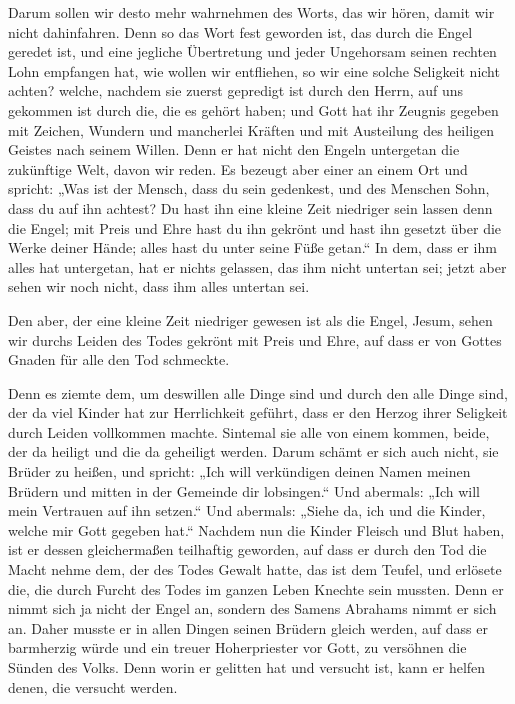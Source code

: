  Darum sollen wir desto mehr wahrnehmen des Worts, das wir
hören, damit wir nicht dahinfahren.  Denn so das Wort fest
geworden ist, das durch die Engel geredet ist, und eine jegliche
Übertretung und jeder Ungehorsam seinen rechten Lohn empfangen hat,
 wie wollen wir entfliehen, so wir eine solche Seligkeit
nicht achten? welche, nachdem sie zuerst gepredigt ist durch den Herrn,
auf uns gekommen ist durch die, die es gehört haben;  und
Gott hat ihr Zeugnis gegeben mit Zeichen, Wundern und mancherlei Kräften
und mit Austeilung des heiligen Geistes nach seinem Willen.
 Denn er hat nicht den Engeln untergetan die zukünftige
Welt, davon wir reden.  Es bezeugt aber einer an einem Ort
und spricht: „Was ist der Mensch, dass du sein gedenkest, und des
Menschen Sohn, dass du auf ihn achtest?  Du hast ihn eine
kleine Zeit niedriger sein lassen denn die Engel; mit Preis und Ehre
hast du ihn gekrönt und hast ihn gesetzt über die Werke deiner Hände;
 alles hast du unter seine Füße getan.`` In dem, dass er
ihm alles hat untergetan, hat er nichts gelassen, das ihm nicht untertan
sei; jetzt aber sehen wir noch nicht, dass ihm alles untertan sei.

 Den aber, der eine kleine Zeit niedriger gewesen ist als
die Engel, Jesum, sehen wir durchs Leiden des Todes gekrönt mit Preis
und Ehre, auf dass er von Gottes Gnaden für alle den Tod schmeckte.

 Denn es ziemte dem, um deswillen alle Dinge sind und
durch den alle Dinge sind, der da viel Kinder hat zur Herrlichkeit
geführt, dass er den Herzog ihrer Seligkeit durch Leiden vollkommen
machte.  Sintemal sie alle von einem kommen, beide, der
da heiligt und die da geheiligt werden. Darum schämt er sich auch nicht,
sie Brüder zu heißen,  und spricht: „Ich will verkündigen
deinen Namen meinen Brüdern und mitten in der Gemeinde dir lobsingen.``
 Und abermals: „Ich will mein Vertrauen auf ihn setzen.``
Und abermals: „Siehe da, ich und die Kinder, welche mir Gott gegeben
hat.``  Nachdem nun die Kinder Fleisch und Blut haben,
ist er dessen gleichermaßen teilhaftig geworden, auf dass er durch den
Tod die Macht nehme dem, der des Todes Gewalt hatte, das ist dem Teufel,
 und erlösete die, die durch Furcht des Todes im ganzen
Leben Knechte sein mussten.  Denn er nimmt sich ja nicht
der Engel an, sondern des Samens Abrahams nimmt er sich an.
 Daher musste er in allen Dingen seinen Brüdern gleich
werden, auf dass er barmherzig würde und ein treuer Hoherpriester vor
Gott, zu versöhnen die Sünden des Volks.  Denn worin er
gelitten hat und versucht ist, kann er helfen denen, die versucht
werden.


